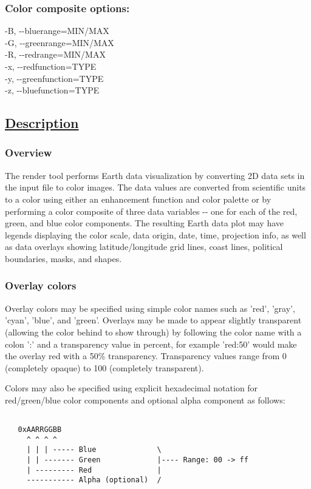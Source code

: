 \subsubsection*{Color composite options:}


  -B, -{-}bluerange=MIN/MAX \\ 
 -G, -{-}greenrange=MIN/MAX \\ 
 -R, -{-}redrange=MIN/MAX \\ 
 -x, -{-}redfunction=TYPE \\ 
 -y, -{-}greenfunction=TYPE \\ 
 -z, -{-}bluefunction=TYPE 
\subsection*{\underline{Description}}
\subsubsection*{Overview}


 The render tool performs Earth data visualization by converting 2D data sets in the input file to color images. The data values are converted from scientific units to a color using either an enhancement function and color palette or by performing a color composite of three data variables -{-} one for each of the red, green, and blue color components. The resulting Earth data plot may have legends displaying the color scale, data origin, date, time, projection info, as well as data overlays showing latitude/longitude grid lines, coast lines, political boundaries, masks, and shapes.
\subsubsection*{Overlay colors}


 Overlay colors may be specified using simple color names such as 'red', 'gray', 'cyan', 'blue', and 'green'. Overlays may be made to appear slightly transparent (allowing the color behind to show through) by following the color name with a colon ':' and a transparency value in percent, for example 'red:50' would make the overlay red with a 50\% transparency. Transparency values range from 0 (completely opaque) to 100 (completely transparent).


 Colors may also be specified using explicit hexadecimal notation for red/green/blue color components and optional alpha component as follows:
\begin{verbatim}

   0xAARRGGBB
     ^ ^ ^ ^          
     | | | ----- Blue              \
     | | ------- Green             |---- Range: 00 -> ff
     | --------- Red               |
     ----------- Alpha (optional)  /
 
\end{verbatim}


